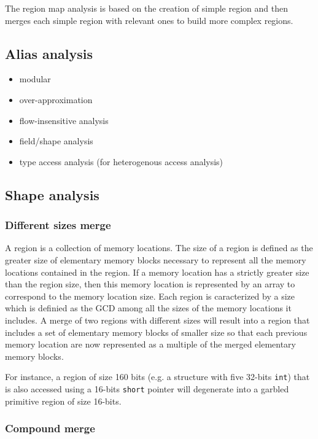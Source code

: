 The region map analysis is based on the creation of simple region and then
merges each simple region with relevant ones to build more complex regions.

\subsection{Alias analysis}

\begin{itemize}
    \item modular
    \item over-approximation
    \item flow-insensitive analysis
    \item field/shape analysis
    \item type access analysis (for heterogenous access analysis)
\end{itemize}



\subsection{Shape analysis}
\label{sec-region-shape-analysis}

\subsubsection{Different sizes merge}

A region is a collection of memory locations. The size of a region is defined
as the greater size of elementary memory blocks necessary to represent all the
memory locations contained in the region. If a memory location has a strictly
greater size than the region size, then this memory location is represented by
an array to correspond to the memory location size.
Each region is caracterized by a size which is definied as the GCD among
all the sizes of the memory locations it includes. A merge of two regions
with different sizes will result into a region that includes a set of
elementary memory blocks of smaller size so that each previous memory location
are now represented as a multiple of the merged elementary memory blocks.

For instance, a region of size 160 bits (e.g. a structure with five 32-bits
\texttt{int}) that is also accessed using a 16-bits \texttt{short} pointer will
degenerate into a garbled primitive region of size 16-bits.

\subsubsection{Compound merge}

